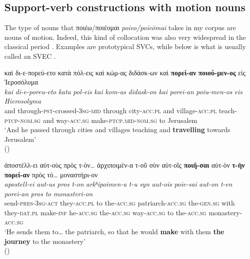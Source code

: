 \documentclass[output=paper,colorlinks,citecolor=brown]{langscibook}
\begin{document}
\subsection{Support-verb constructions with motion nouns}\label{sec:vc:5:1}

The type of nouns that ποιέω/ποιέομαι \emph{poieo/poieōmai} takes in my corpus are nouns
of motion. Indeed, this kind of collocation was also very widespread in the classical
period \citep{DePasqualeNoemi-2023335}. Examples  are prototypical SVCs,
while  below is what is usually called an SVEC
\parencites{VivesRobert-198467,GrossGaston-1989673,BanosJoséMiguel-2014280}.


\ea\label{ex:vc:4}

\ea\label{ex:vc:4a}

\glll καὶ δι-ε-πορεύ-ετο κατὰ πόλ-εις καὶ κώμ-ας διδάσκ-ων καὶ \textbf{πορεί-αν} \textbf{ποιού-μεν-ος} εἰς Ἱεροσόλυμα\\
 \textit{kai} \textit{di-e-poreu-eto} \textit{kata} \textit{pol-eis} \textit{kai} \textit{kom-as} \textit{didask-on} \textit{kai} \textit{porei-an} \textit{poiu-men-os} \textit{eis} \textit{Hierosolyma}\\
and through-\textsc{pst-}crossed-3\textsc{sg-mid} through city-\textsc{acc.pl} and
village-\textsc{acc.pl} teach-\textsc{ptcp-nom.sg} and way-\textsc{acc.sg} make-\textsc{ptcp.mid}-\textsc{nom.sg} to Jerusalem\\
\newpage
\glt `And he passed through cities and villages teaching and \textbf{travelling} towards Jerusalem' \\
\hspace*{\fill}()

\ex\label{ex:vc:4b}

\glll ἀποστέλλ-ει αὐτ-οὺς πρὸς τ-ὸν\ldots{} ἀρχιποιμέν-α τ-οῦ σὺν αὐτ-οῖς \textbf{ποιῆ-σαι} αὐτ-ὸν \textbf{τ-ὴν} \textbf{πορεί-αν} πρὸς τὸ\ldots{} μοναστήρι-ον\\
 \textit{apostell-ei} \textit{aut-us} \textit{pros} \textit{t-on} \textit{arkʰipoimen-a} \textit{t-u} \textit{syn} \textit{aut-ois} \textit{poie-sai} \textit{aut-on} \textit{t-en} \textit{porei-an} \textit{pros} \textit{to} \textit{monasteri-on}\\
send-\textsc{pres-3sg-act} they-\textsc{acc.pl} to the-\textsc{acc.sg} patriarch-\textsc{acc.sg} the-\textsc{gen.sg} with they-\textsc{dat.pl} make-\textsc{inf} he-\textsc{acc.sg} the-\textsc{acc.sg} way-\textsc{acc.sg} to the-\textsc{acc.sg}
monastery-\textsc{acc.sg}\\
\glt `He sends them to\ldots{} the patriarch, so that he would \textbf{make} with them \textbf{the journey} to the monastery' \\
\hspace*{\fill}()
\end{document}
